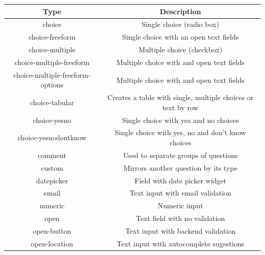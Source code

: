 \begin{longtable}[c]{|c|c|}
\hline
\textbf{Type}                     & \textbf{Description}                                        \\ \hline
\endhead
choice                            & Single choice (radio box)                                   \\ \hline
choice-freeform                   & Single choice with an open text fields                      \\ \hline
choice-multiple                   & Multiple choice (checkbox)                                  \\ \hline
choice-multiple-freeform          & Multiple choice with and open text fields                   \\ \hline
choice-multiple-freeform-options  & Multiple choice with and open text fields                   \\ \hline
choice-tabular                    & Creates a table with single, multiple choices or text by row      \\ \hline
choice-yesno                      & Single choice with yea and no choices                       \\ \hline
choice-yesnodontknow              & Single choice with yes, no and don't know choices           \\ \hline
comment                           & Used to separate groups of questions                        \\ \hline
custom                            & Mirrors another question by its type                        \\ \hline
datepicker                        & Field with date picker widget                               \\ \hline
email                             & Text input with email validation                            \\ \hline
numeric                           & Numeric input                                               \\ \hline
open                              & Text field with no validation                               \\ \hline
open-button                       & Text input with backend validation                          \\ \hline
open-location                     & Text input with autocomplete sugestions                     \\ \hline

\end{longtable}
